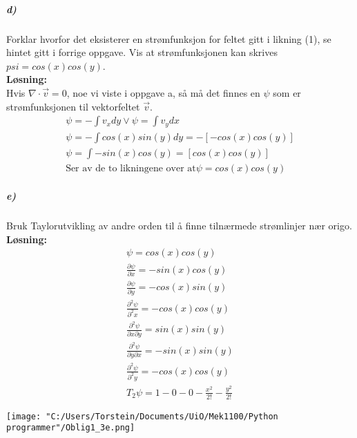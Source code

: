 \documentclass[11pt, A4paper,norsk]{article}
\begin{document}
			\subparagraph{d)}
				\begin{flushleft}
Forklar hvorfor det eksisterer en strømfunksjon for feltet gitt i likning (1), se hintet gitt i forrige oppgave. Vis at strømfunksjonen kan skrives $psi = cos(x) cos(y)$. \\
\vspace{1mm}
\textbf{Løsning:} \\
\vspace{1mm}
Hvis $\nabla \cdot \vec{v} = 0$, noe vi viste i oppgave a, så må det finnes en $\psi$ som er strømfunksjonen til vektorfeltet $\vec{v}$.
					\begin{align}
\psi = - \int v_x dy \vee \psi = \int v_y dx\nonumber \\
\psi = - \int cos(x)sin(y)dy = -\left[-cos(x)cos(y)\right] \nonumber \\
\psi = \int -sin(x)cos(y) = \left[cos(x)cos(y)\right] \nonumber \\
\text{Ser av de to likningene over at}
\psi = cos(x)cos(y)
					\end{align}
				\end{flushleft}










			\subparagraph{e)}
				\begin{flushleft}
Bruk Taylorutvikling av andre orden til å finne tilnærmede strømlinjer nær origo. \\
\vspace{1mm}
\textbf{Løsning:} \\
\vspace{1mm}
					\begin{align}
\psi = cos(x)cos(y) \nonumber \\
\frac{\partial \psi}{\partial x} = -sin(x)cos(y) \nonumber \\
\frac{\partial \psi}{\partial y} = -cos(x)sin(y) \nonumber \\
\frac{\partial^2 \psi}{\partial^2 x} = -cos(x)cos(y) \nonumber \\
\frac{\partial^2 \psi}{\partial x \partial y} = sin(x)sin(y) \nonumber \\
\frac{\partial^2 \psi}{\partial y \partial x} = -sin(x)sin(y) \nonumber \\
\frac{\partial^2 \psi}{\partial^2 y} = -cos(x)cos(y) \nonumber \\
T_2 \psi = 1 -0 -0 -\frac{x^2}{2!} -\frac{y^2}{2!} \nonumber
					\end{align}
				\end{flushleft}

\texttt{[image: "C:/Users/Torstein/Documents/UiO/Mek1100/Python programmer"/Oblig1\_3e.png]}
\end{document}

